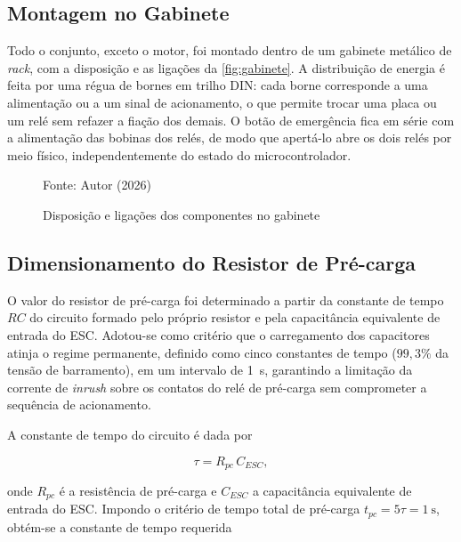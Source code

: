 \subsection{Montagem no Gabinete}
\label{sec:montagem_gabinete}

Todo o conjunto, exceto o motor, foi montado dentro de um gabinete metálico
de \textit{rack}, com a disposição e as ligações da \autoref{fig:gabinete}. A
distribuição de energia é feita por uma régua de bornes em trilho DIN: cada
borne corresponde a uma alimentação ou a um sinal de acionamento, o que permite
trocar uma placa ou um relé sem refazer a fiação dos demais. O botão de
emergência fica em série com a alimentação das bobinas dos relés, de modo que
apertá-lo abre os dois relés por meio físico, independentemente do estado do
microcontrolador.

\begin{figure}[H]
    \centering
    \caption{Disposição e ligações dos componentes no gabinete}
    \label{fig:gabinete}
    \resizebox{\textwidth}{!}{}

    Fonte: Autor (2026)
\end{figure}

\subsection{Dimensionamento do Resistor de Pré-carga}

O valor do resistor de pré-carga foi determinado a partir da constante de tempo
$RC$ do circuito formado pelo próprio resistor e pela capacitância equivalente
de entrada do ESC. Adotou-se como critério que o carregamento dos capacitores
atinja o regime permanente, definido como cinco constantes de tempo
($99{,}3\%$ da tensão de barramento), em um intervalo de \SI{1}{\second},
garantindo a limitação da corrente de \textit{inrush} sobre os contatos do relé de
pré-carga sem comprometer a sequência de acionamento.

A constante de tempo do circuito é dada por

\begin{equation}
    \tau = R_{pc} \, C_{ESC},
    \label{eq:tau_precarga}
\end{equation}

\noindent onde $R_{pc}$ é a resistência de pré-carga e $C_{ESC}$ a capacitância
equivalente de entrada do ESC. Impondo o critério de tempo total de pré-carga
$t_{pc} = 5\tau = \SI{1}{\second}$, obtém-se a constante de tempo requerida

